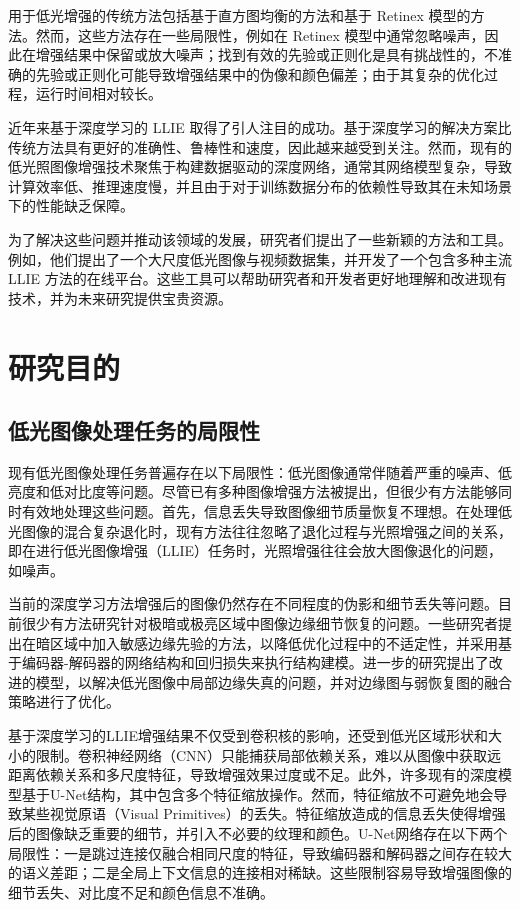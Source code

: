 \documentclass[a4paper]{ctexart}
\begin{document}
	用于低光增强的传统方法包括基于直方图均衡的方法和基于 Retinex 模型的方法。然而，这些方法存在一些局限性，例如在 Retinex 模型中通常忽略噪声\cite{liu2021retinex, xu2020learning}，因此在增强结果中保留或放大噪声；找到有效的先验或正则化是具有挑战性的，不准确的先验或正则化可能导致增强结果中的伪像和颜色偏差；由于其复杂的优化过程，运行时间相对较长。
	
	近年来基于深度学习的 LLIE 取得了引人注目的成功。基于深度学习的解决方案比传统方法具有更好的准确性、鲁棒性和速度，因此越来越受到关注。然而，现有的低光照图像增强技术聚焦于构建数据驱动的深度网络，通常其网络模型复杂，导致计算效率低、推理速度慢，并且由于对于训练数据分布的依赖性导致其在未知场景下的性能缺乏保障。
	
	为了解决这些问题并推动该领域的发展，研究者们提出了一些新颖的方法和工具。例如，他们提出了一个大尺度低光图像与视频数据集，并开发了一个包含多种主流 LLIE 方法的在线平台。这些工具可以帮助研究者和开发者更好地理解和改进现有技术，并为未来研究提供宝贵资源。
	
	\section{研究目的}
	
	\subsection{低光图像处理任务的局限性}
	
	现有低光图像处理任务普遍存在以下局限性：低光图像通常伴随着严重的噪声、低亮度和低对比度等问题。尽管已有多种图像增强方法被提出，但很少有方法能够同时有效地处理这些问题。首先，信息丢失导致图像细节质量恢复不理想\cite{zhang2023frc}。在处理低光图像的混合复杂退化时，现有方法往往忽略了退化过程与光照增强之间的关系\cite{guo2023low}，即在进行低光图像增强（LLIE）任务时，光照增强往往会放大图像退化的问题，如噪声。
	
	当前的深度学习方法增强后的图像仍然存在不同程度的伪影和细节丢失等问题。目前很少有方法研究针对极暗或极亮区域中图像边缘细节恢复的问题。一些研究者提出在暗区域中加入敏感边缘先验的方法，以降低优化过程中的不适定性，并采用基于编码器-解码器的网络结构和回归损失来执行结构建模。进一步的研究提出了改进的模型，以解决低光图像中局部边缘失真的问题，并对边缘图与弱恢复图的融合策略进行了优化。
	
	基于深度学习的LLIE增强结果不仅受到卷积核的影响，还受到低光区域形状和大小的限制。卷积神经网络（CNN）只能捕获局部依赖关系，难以从图像中获取远距离依赖关系和多尺度特征，导致增强效果过度或不足。此外，许多现有的深度模型基于U-Net结构，其中包含多个特征缩放操作\cite{ronneberger2015u}。然而，特征缩放不可避免地会导致某些视觉原语（Visual Primitives）的丢失\cite{zhang2021accurate}。特征缩放造成的信息丢失使得增强后的图像缺乏重要的细节，并引入不必要的纹理和颜色。U-Net网络存在以下两个局限性：一是跳过连接仅融合相同尺度的特征，导致编码器和解码器之间存在较大的语义差距；二是全局上下文信息的连接相对稀缺。这些限制容易导致增强图像的细节丢失、对比度不足和颜色信息不准确。
	
\end{document}
